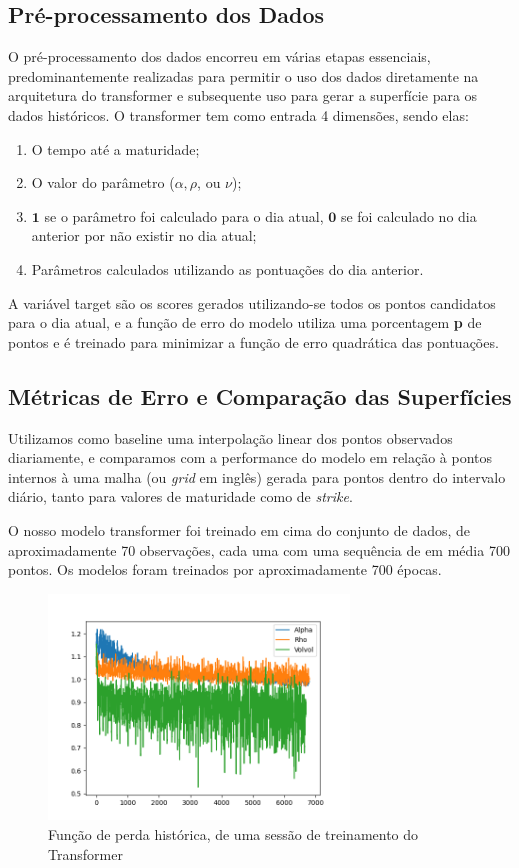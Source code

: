 \subsection{Pré-processamento dos Dados}

O pré-processamento dos dados encorreu em várias etapas essenciais, predominantemente realizadas para permitir o uso dos dados diretamente na arquitetura do transformer e subsequente uso para gerar a superfície para os dados históricos. O transformer tem como entrada 4 dimensões, sendo elas: 
\begin{enumerate}
\item O tempo até a maturidade; 
\item O valor do parâmetro ($\alpha, \rho$, ou $\nu$); 
\item $\mathbf{1}$ se o parâmetro foi calculado para o dia atual, $\mathbf{0}$ se foi calculado no dia anterior por não existir no dia atual; 
\item Parâmetros calculados utilizando as pontuações do dia anterior.
\end{enumerate}

A variável target são os scores gerados utilizando-se todos os pontos candidatos para o dia atual, e a função de erro do modelo utiliza uma porcentagem \textbf{p} de pontos e é treinado para minimizar a função de erro quadrática das pontuações.

\subsection{Métricas de Erro e Comparação das Superfícies}

Utilizamos como baseline uma interpolação linear dos pontos observados diariamente, e comparamos com a performance do modelo em relação à pontos internos à uma malha (ou \textit{grid} em inglês) gerada para pontos dentro do intervalo diário, tanto para valores de maturidade como de \textit{strike}.

O nosso modelo transformer foi treinado em cima do conjunto de dados, de aproximadamente 70 observações, cada uma com uma sequência de em média 700 pontos. Os modelos foram treinados por aproximadamente 700 épocas.

\begin{figure}
	\begin{center}
		\includegraphics[width=8cm]{resources/losses.png}
		\caption{Função de perda histórica, de uma sessão de treinamento do Transformer}
	\end{center}
\end{figure}
	
